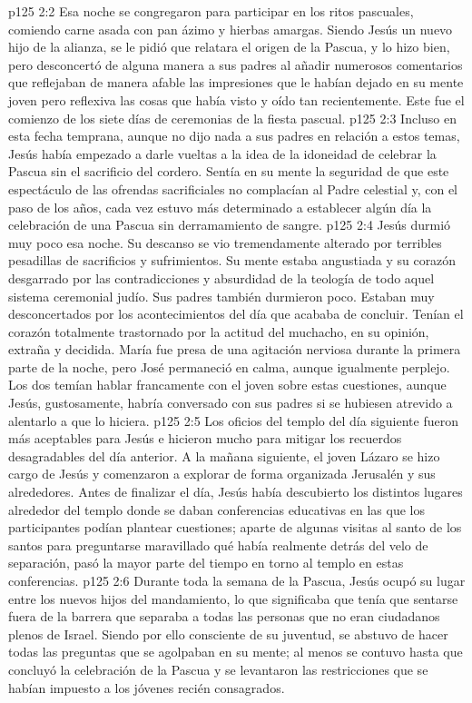 \vs p125 2:2 Esa noche se congregaron para participar en los ritos pascuales, comiendo carne asada con pan ázimo y hierbas amargas. Siendo Jesús un nuevo hijo de la alianza, se le pidió que relatara el origen de la Pascua, y lo hizo bien, pero desconcertó de alguna manera a sus padres al añadir numerosos comentarios que reflejaban de manera afable las impresiones que le habían dejado en su mente joven pero reflexiva las cosas que había visto y oído tan recientemente. Este fue el comienzo de los siete días de ceremonias de la fiesta pascual.
\vs p125 2:3 Incluso en esta fecha temprana, aunque no dijo nada a sus padres en relación a estos temas, Jesús había empezado a darle vueltas a la idea de la idoneidad de celebrar la Pascua sin el sacrificio del cordero. Sentía en su mente la seguridad de que este espectáculo de las ofrendas sacrificiales no complacían al Padre celestial y, con el paso de los años, cada vez estuvo más determinado a establecer algún día la celebración de una Pascua sin derramamiento de sangre.
\vs p125 2:4 Jesús durmió muy poco esa noche. Su descanso se vio tremendamente alterado por terribles pesadillas de sacrificios y sufrimientos. Su mente estaba angustiada y su corazón desgarrado por las contradicciones y absurdidad de la teología de todo aquel sistema ceremonial judío. Sus padres también durmieron poco. Estaban muy desconcertados por los acontecimientos del día que acababa de concluir. Tenían el corazón totalmente trastornado por la actitud del muchacho, en su opinión, extraña y decidida. María fue presa de una agitación nerviosa durante la primera parte de la noche, pero José permaneció en calma, aunque igualmente perplejo. Los dos temían hablar francamente con el joven sobre estas cuestiones, aunque Jesús, gustosamente, habría conversado con sus padres si se hubiesen atrevido a alentarlo a que lo hiciera.
\vs p125 2:5 Los oficios del templo del día siguiente fueron más aceptables para Jesús e hicieron mucho para mitigar los recuerdos desagradables del día anterior. A la mañana siguiente, el joven Lázaro se hizo cargo de Jesús y comenzaron a explorar de forma organizada Jerusalén y sus alrededores. Antes de finalizar el día, Jesús había descubierto los distintos lugares alrededor del templo donde se daban conferencias educativas en las que los participantes podían plantear cuestiones; aparte de algunas visitas al santo de los santos para preguntarse maravillado qué había realmente detrás del velo de separación, pasó la mayor parte del tiempo en torno al templo en estas conferencias.
\vs p125 2:6 Durante toda la semana de la Pascua, Jesús ocupó su lugar entre los nuevos hijos del mandamiento, lo que significaba que tenía que sentarse fuera de la barrera que separaba a todas las personas que no eran ciudadanos plenos de Israel. Siendo por ello consciente de su juventud, se abstuvo de hacer todas las preguntas que se agolpaban en su mente; al menos se contuvo hasta que concluyó la celebración de la Pascua y se levantaron las restricciones que se habían impuesto a los jóvenes recién consagrados.
